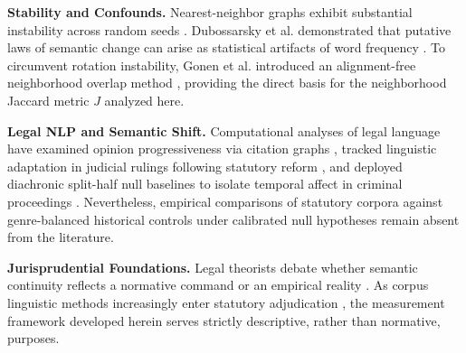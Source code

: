 \documentclass[conference]{IEEEtran}
\begin{document}
\textbf{Stability and Confounds.} Nearest-neighbor graphs exhibit substantial instability across random seeds \cite{antoniak2018evaluating, wendlandt2018factors, hellrich2016bad}. Dubossarsky et al. demonstrated that putative laws of semantic change can arise as statistical artifacts of word frequency \cite{dubossarsky2017outta}. To circumvent rotation instability, Gonen et al. introduced an alignment-free neighborhood overlap method \cite{gonen2020simple}, providing the direct basis for the neighborhood Jaccard metric $J$ analyzed here.

\textbf{Legal NLP and Semantic Shift.} Computational analyses of legal language have examined opinion progressiveness via citation graphs \cite{soni2021follow}, tracked linguistic adaptation in judicial rulings following statutory reform \cite{braun2022tracking}, and deployed diachronic split-half null baselines to isolate temporal affect in criminal proceedings \cite{wang2026aetas}. Nevertheless, empirical comparisons of statutory corpora against genre-balanced historical controls under calibrated null hypotheses remain absent from the literature.

\textbf{Jurisprudential Foundations.} Legal theorists debate whether semantic continuity reflects a normative command or an empirical reality \cite{hart1961concept, eskridge1987dynamic, scalia2012reading}. As corpus linguistic methods increasingly enter statutory adjudication \cite{lee2018judging}, the measurement framework developed herein serves strictly descriptive, rather than normative, purposes.
\end{document}
